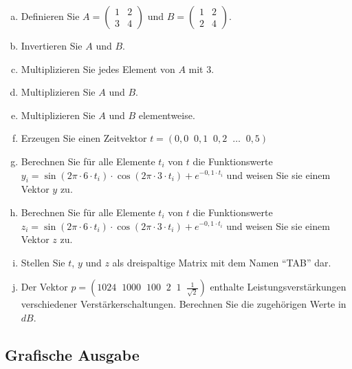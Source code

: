 \begin{enumerate}[a)]
    \item Definieren Sie $A=\begin{pmatrix}1&2\\3&4\end{pmatrix}$ und $B=\begin{pmatrix}1&2\\2&4\end{pmatrix}$.
    \item Invertieren Sie $A$ und $B$.
    \item Multiplizieren Sie jedes Element von $A$ mit $3$.
    \item Multiplizieren Sie $A$ und $B$.
    \item Multiplizieren Sie $A$ und $B$ elementweise.
    \item Erzeugen Sie einen Zeitvektor $t=(0,0 \; \; 0,1 \; \; 0,2 \; \; \dots \; \; 0,5)$
    \item Berechnen Sie für alle Elemente $t_i$ von $t$ die Funktionswerte\\
    $y_i = \sin{(2\pi \cdot 6 \cdot t_i)} \cdot \cos{(2\pi \cdot 3 \cdot t_i)} + e^{-0,1 \cdot t_i}$ und weisen Sie sie einem Vektor $y$ zu.
    \item Berechnen Sie für alle Elemente $t_i$ von $t$ die Funktionswerte\\
    $z_i = \sin{(2\pi \cdot 6 \cdot t_i)} \cdot \cos{(2\pi \cdot 3 \cdot t_i)} + e^{-0,1 \cdot t_i}$ und weisen Sie sie einem Vektor $z$ zu.
    \item Stellen Sie $t$, $y$ und $z$ als dreispaltige Matrix mit dem Namen \enquote{TAB} dar.
    \item Der Vektor $p=(1024 \; \; 1000 \; \; 100 \; \; 2 \; \; 1 \; \; \frac{1}{\sqrt{2}})$ enthalte Leistungsverstärkungen verschiedener Verstärkerschaltungen. Berechnen Sie die zugehörigen Werte in $dB$.
\end{enumerate}

\subsection{Grafische Ausgabe}

